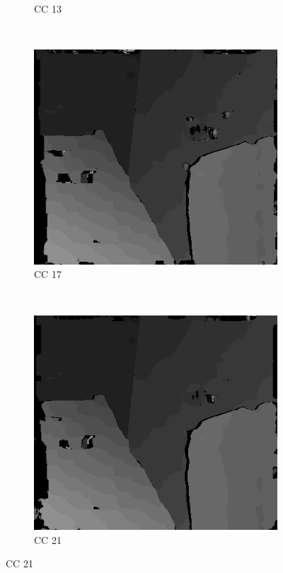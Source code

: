 \begin{figure}
\begin{subfigure}[b]{0.23\textwidth}
    \caption{CC 13}
  \end{subfigure}
  ~
  \begin{subfigure}[b]{0.23\textwidth}
    \centering
    \includegraphics[width=\textwidth]{images/stereo-pairs/venus_dual_crosschecked_17.png}
    \caption{CC 17}
  \end{subfigure}
  ~
  \begin{subfigure}[b]{0.23\textwidth}
    \centering
    \includegraphics[width=\textwidth]{images/stereo-pairs/venus_dual_crosschecked_21.png}
    \caption{CC 21}
  \end{subfigure}


\end{figure}
